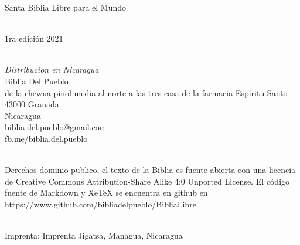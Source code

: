 Santa Biblia Libre para el Mundo\\
\strut \\
1ra edición 2021\\
\strut \\
\emph{Distribucion en Nicaragua}\\
Biblia Del Pueblo\\
de la chewua pinol media al norte a las tres casa de la farmacia
Espiritu Santo\\
43000 Granada\\
Nicaragua\\
biblia.del.pueblo@gmail.com\\
fb.me/biblia.del.pueblo\\
\strut \\
Derechos dominio publico, el texto de la Biblia es fuente abierta con
una licencia de Creative Commons Attribution-Share Alike 4:0 Unported
License. El código fuente de Markdown y XeTeX se encuentra en github
en\\
https://www.github.com/bibliadelpueblo/BibliaLibre\\
\strut \\
Imprenta: Imprenta Jigatsa, Managua, Nicaragua\\
